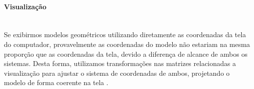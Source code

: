 

\paragraph{Visualização} \mbox{}\\

Se exibirmos modelos geométricos utilizando diretamente as coordenadas da tela do computador, provavelmente as coordenadas do modelo não estariam na mesma proporção que as coordenadas da tela, devido a diferença de alcance de ambos os sistemas. Desta forma, utilizamos transformações nas matrizes relacionadas a visualização para ajustar o sistema de coordenadas de ambos, projetando o modelo de forma coerente na tela \cite{opengl8th}.



